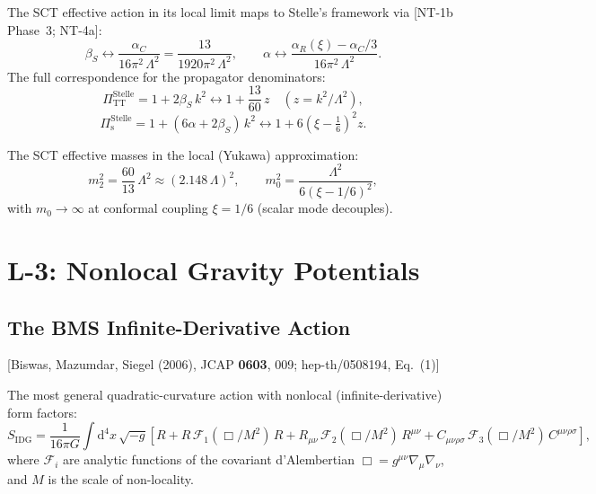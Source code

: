 \documentclass[11pt,a4paper]{article}
\theoremstyle{plain}
\theoremstyle{definition}
\theoremstyle{remark}
\newcommand{\dd}{\mathrm{d}}
\newcommand{\fromlit}[1]{\textcolor{sctblue}{\textsf{[#1]}}}
\begin{document}
The SCT effective action in its local limit maps to Stelle's
framework via \fromlit{NT-1b Phase~3; NT-4a}:
\begin{equation}\label{eq:sct-to-stelle}
  \beta_S \leftrightarrow \frac{\alpha_C}{16\pi^2\,\Lambda^2}
  = \frac{13}{1920\pi^2\,\Lambda^2},
  \qquad
  \alpha \leftrightarrow \frac{\alpha_R(\xi) - \alpha_C/3}
  {16\pi^2\,\Lambda^2}.
\end{equation}
The full correspondence for the propagator denominators:
\begin{equation}\label{eq:Pi-stelle-map}
  \Pi_{\mathrm{TT}}^{\mathrm{Stelle}} = 1 + 2\beta_S\, k^2
  \longleftrightarrow 1 + \frac{13}{60}\,z
  \quad (z = k^2/\Lambda^2),
\end{equation}
\begin{equation}
  \Pi_{\mathrm{s}}^{\mathrm{Stelle}} = 1 + (6\alpha + 2\beta_S)\,k^2
  \longleftrightarrow 1 + 6\left(\xi - \tfrac{1}{6}\right)^2 z.
\end{equation}

The SCT effective masses in the local (Yukawa) approximation:
\begin{equation}\label{eq:sct-masses}
  m_2^2 = \frac{60}{13}\,\Lambda^2 \approx (2.148\,\Lambda)^2,
  \qquad
  m_0^2 = \frac{\Lambda^2}{6(\xi - 1/6)^2},
\end{equation}
with $m_0 \to \infty$ at conformal coupling $\xi = 1/6$
(scalar mode decouples).


\section{L-3: Nonlocal Gravity Potentials}\label{sec:nonlocal}

\subsection{The BMS Infinite-Derivative Action}

\fromlit{Biswas, Mazumdar, Siegel (2006), JCAP \textbf{0603}, 009;
hep-th/0508194, Eq.~(1)}

The most general quadratic-curvature action with nonlocal
(infinite-derivative) form factors:
\begin{equation}\label{eq:idg-action}
  S_{\mathrm{IDG}} = \frac{1}{16\pi G}\int \dd^4 x\,\sqrt{-g}\left[
    R + R\,\mathcal{F}_1(\Box/M^2)\,R
    + R_{\mu\nu}\,\mathcal{F}_2(\Box/M^2)\,R^{\mu\nu}
    + C_{\mu\nu\rho\sigma}\,\mathcal{F}_3(\Box/M^2)\,
    C^{\mu\nu\rho\sigma}
  \right],
\end{equation}
where $\mathcal{F}_i$ are analytic functions of the covariant
d'Alembertian $\Box = g^{\mu\nu}\nabla_\mu\nabla_\nu$, and $M$ is
the scale of non-locality.
\end{document}

